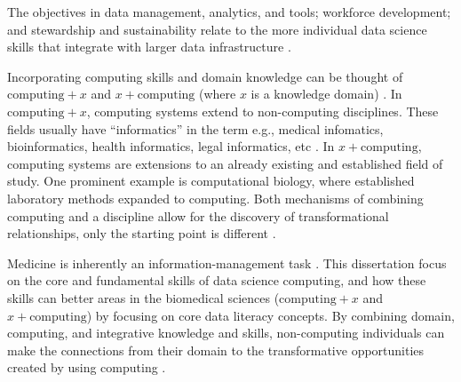 \documentclass[010-intro.tex]{subfiles}
\begin{document}
The objectives in
data management, analytics, and tools;
workforce development;
and stewardship and sustainability
relate to the more individual data science skills that integrate with larger data infrastructure
\cite{nationalinstitutesofhealthNIHStrategicPlan2020}.

Incorporating computing skills and domain knowledge can be thought of
$\text{computing} + x$ and $x + \text{computing}$ (where $x$ is a knowledge domain)
\cite{cc2020}.
In $\text{computing} + x$, computing systems extend to non-computing disciplines.
These fields usually have ``informatics'' in the term
e.g., medical infomatics, bioinformatics, health informatics, legal informatics, etc \cite{cc2020}.
In $x + \text{computing}$,
computing systems are extensions to an already existing and established field of study.
One prominent example is computational biology,
where established laboratory methods expanded to computing.
Both mechanisms of combining computing and a discipline allow for the discovery of transformational relationships,
only the starting point is different \cite{cc2020}.

Medicine is inherently an information-management task
\cite{shortliffe1993adolescence}.
This dissertation focus on the core and fundamental skills
of data science computing, and how these skills can better areas in the biomedical sciences
($\text{computing} + x$ and $x + \text{computing}$)
by focusing on core data literacy concepts.
By combining domain, computing, and integrative knowledge and skills,
non-computing individuals can make the connections from their domain to the transformative opportunities
created by using computing \cite{cc2020}.
\end{document}
